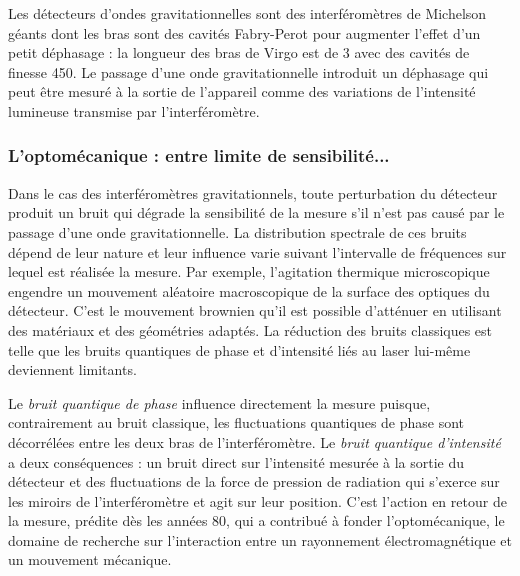\documentclass[12pt,a4paper]{article}
\begin{document}
Les détecteurs d'ondes gravitationnelles sont des interféromètres de Michelson géants dont les bras sont des cavités Fabry-Perot pour augmenter l'effet d'un petit déphasage : la longueur des bras de Virgo est de \unit{3}{\kilo\meter} avec des cavités de finesse 450.
Le passage d'une onde gravitationnelle introduit un déphasage qui peut être mesuré à la sortie de l'appareil comme des variations de l'intensité lumineuse transmise par l'interféromètre.

\subsubsection{L'optomécanique : entre limite de sensibilité...}

Dans le cas des interféromètres gravitationnels, toute perturbation du détecteur produit un bruit qui dégrade la sensibilité de la mesure s'il n'est pas causé par le passage d'une onde gravitationnelle.
La distribution spectrale de ces bruits dépend de leur nature et leur influence varie suivant l'intervalle de fréquences sur lequel est réalisée la mesure.
Par exemple, l'agitation thermique microscopique engendre un mouvement aléatoire macroscopique de la surface des optiques du détecteur.
C'est le mouvement brownien qu'il est possible d'atténuer en utilisant des matériaux et des géométries adaptés.
La réduction des bruits classiques est telle que les bruits quantiques de phase et d'intensité liés au laser lui-même deviennent limitants.

Le \textit{bruit quantique de phase} influence directement la mesure puisque, contrairement au bruit classique, les fluctuations quantiques de phase sont décorrélées entre les deux bras de l'interféromètre.
Le \textit{bruit quantique d'intensité} a deux conséquences : un bruit direct sur l'intensité mesurée à la sortie du détecteur et des fluctuations de la force de pression de radiation qui s'exerce sur les miroirs de l'interféromètre et agit sur leur position.
C'est l'action en retour de la mesure, prédite dès les années 80, qui a contribué à fonder l'optomécanique, le domaine de recherche sur l'interaction entre un rayonnement électromagnétique et un mouvement mécanique.
\end{document}
